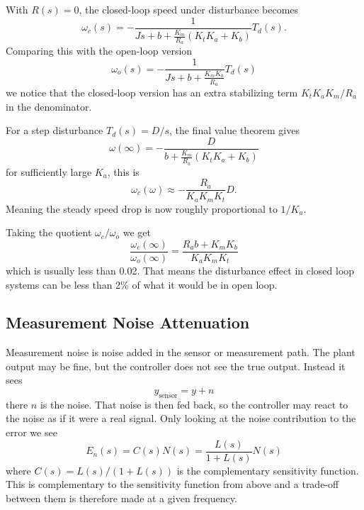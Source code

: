 With $R(s) = 0$, the closed-loop speed under disturbance becomes
\begin{equation*}
  \omega_{c}(s) = - \frac{1}{Js + b+ \frac{K_m}{R_a} \left( K_t K_a + K_b \right)} T_d(s)
.\end{equation*}
Comparing this with the open-loop version
\begin{equation*}
  \omega_{o}(s) = - \frac{1}{Js + b + \frac{K_{m} K_b}{R_a}} T_d(s)
\end{equation*}
we notice that the closed-loop version has an extra stabilizing term $K_t K_a K_m / R_a$ in the denominator. 

For a step disturbance $T_d(s) = D / s$, the final value theorem gives
\begin{equation*}
  \omega (\infty) = - \frac{D}{b + \frac{K_m}{R_a} \left( K_t K_a + K_b \right)}
\end{equation*}
for sufficiently large $K_a$, this is
\begin{equation*}
  \omega_c(\omega) \approx - \frac{R_a}{K_a K_m K_t} D
.\end{equation*}
Meaning the steady speed drop is now roughly proportional to $1 / K_a$. 

Taking the quotient $\omega_c / \omega_o$ we get
\begin{equation*}
  \frac{\omega_c(\infty)}{\omega_o(\infty)} = \frac{R_a b + K_m K_b}{K_a K_m K_t}
\end{equation*}
which is usually less than \num{0,02}. 
That means the disturbance effect in closed loop systems  can be less than 2\% of what it would be in open loop.

\subsection{Measurement Noise Attenuation}
Measurement noise is noise added in the sensor or measurement path.
The plant output may be fine, but the controller does not see the true output.
Instead it sees
\begin{equation*}
  y_{\text{sensor}} = y + n
\end{equation*}
there $n$ is the noise.
That noise is then fed back, so the controller may react to the noise as if it were a real signal. 
Only looking at the noise contribution to the error we see
\begin{equation*}
  E_n(s) = C(s) N(s) = \frac{L(s)}{1+ L(s)}N(s)
\end{equation*}
where $C(s) = L(s) / (1+L(s))$ is the complementary sensitivity function.
This is complementary to the sensitivity function from above and a trade-off between them is therefore made at a given frequency.

